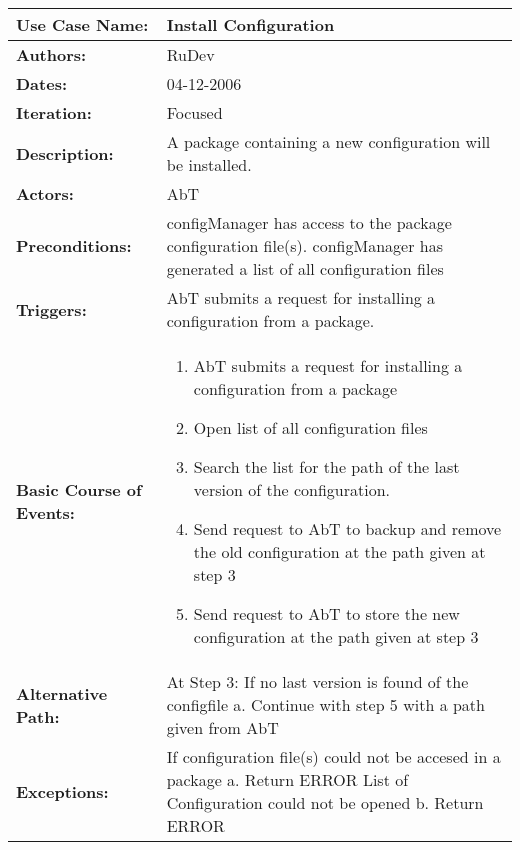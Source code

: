 \begin{tabularx}{\linewidth}{|l|X|}
\hline
\textbf{Use Case Name:} & \textbf{Install Configuration} \\
\hline
\textbf{Authors:} & RuDev \\
\hline
\textbf{Dates:} & 04-12-2006 \\
\hline
\textbf{Iteration:} & Focused \\
\hline
\textbf{Description:} & A package containing a new configuration will be installed. \\
\hline
\textbf{Actors:} & AbT \\
\hline
\textbf{Preconditions:} & configManager has access to the package configuration file(s). \newline configManager has generated a list of all configuration files \\
\hline
\textbf{Triggers:} & AbT submits a request for installing a configuration from a package. \\
\hline
\textbf{Basic Course of Events:} & 
\begin{minipage}{\linewidth} 
  \vspace{0.05em}
  \begin{enumerate}
   \item AbT submits a request for installing a configuration from a package
   \item Open list of all configuration files 
   \item Search the list for the path of the last version of the configuration.
   \item Send request to AbT to backup and remove the old configuration at the path given at step 3
   \item Send request to AbT to store the new configuration at the path given at step 3
  \end{enumerate}
  \vspace{0.05em}
\end{minipage}
\\
\hline 
\textbf{Alternative Path:} & At Step 3: If no last version is found of the configfile \newline a. Continue with step 5 with a path given from AbT  \\
\hline
\textbf{Exceptions:} & If configuration file(s) could not be accesed in a package \newline a. Return ERROR \newline\newline List of Configuration could not be opened \newline b. Return ERROR \\

\end{tabularx}
